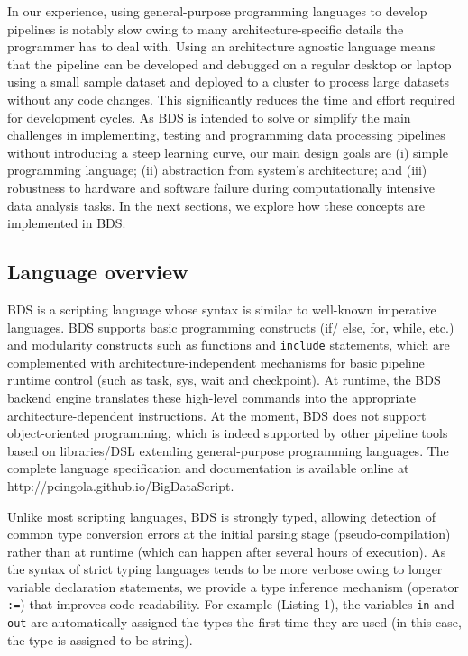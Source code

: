 In our experience, using general-purpose programming languages to develop pipelines is notably slow owing to many architecture-specific details the programmer has to deal with. Using an architecture agnostic language means that the pipeline can be developed and debugged on a regular desktop or laptop using a small sample dataset and deployed to a cluster to process large datasets without any code changes. This significantly reduces the time and effort required for development cycles. As BDS is intended to solve or simplify the main challenges in implementing, testing and programming data processing pipelines without introducing a steep learning curve, our main design goals are (i) simple programming language; (ii) abstraction from system’s architecture; and (iii) robustness to hardware and software failure during computationally intensive data analysis tasks. In the next sections, we explore how these concepts are implemented in BDS.

\subsection{Language overview}

BDS is a scripting language whose syntax is similar to well-known imperative languages. BDS supports basic programming constructs (if/ else, for, while, etc.) and modularity constructs such as functions and \texttt{include} statements, which are complemented with architecture-independent mechanisms for basic pipeline runtime control (such as task, sys, wait and checkpoint). At runtime, the BDS backend engine translates these high-level commands into the appropriate architecture-dependent instructions. At the moment, BDS does not support object-oriented programming, which is indeed supported by other pipeline tools based on libraries/DSL extending general-purpose programming languages. The complete language specification and documentation is available online at http://pcingola.github.io/BigDataScript.

Unlike most scripting languages, BDS is strongly typed, allowing detection of common type conversion errors at the initial parsing stage (pseudo-compilation) rather than at runtime (which can happen after several hours of execution). As the syntax of strict typing languages tends to be more verbose owing to longer variable declaration statements, we provide a type inference mechanism (operator \texttt{:=}) that improves code readability. For example (Listing 1), the variables \texttt{in} and \texttt{out} are automatically assigned the types the first time they are used (in this case, the type is assigned to be string).

